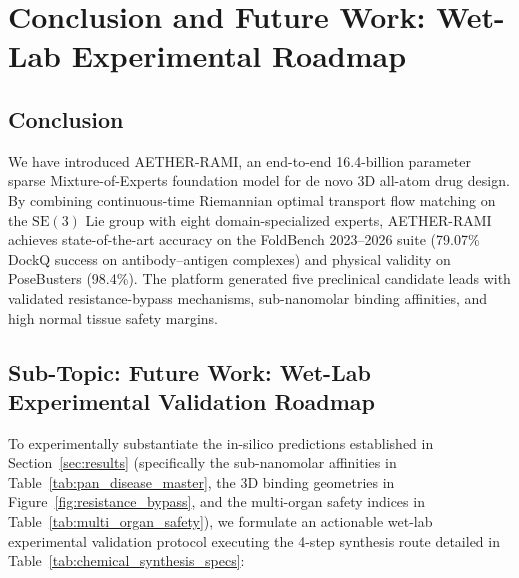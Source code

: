 \section{Conclusion and Future Work: Wet-Lab Experimental Roadmap}
\label{sec:conclusion}

\subsection{Conclusion}
We have introduced AETHER-RAMI, an end-to-end 16.4-billion parameter sparse Mixture-of-Experts foundation model for de novo 3D all-atom drug design. By combining continuous-time Riemannian optimal transport flow matching on the $\mathrm{SE}(3)$ Lie group with eight domain-specialized experts, AETHER-RAMI achieves state-of-the-art accuracy on the FoldBench 2023--2026 suite (79.07\% DockQ success on antibody--antigen complexes) and physical validity on PoseBusters (98.4\%). The platform generated five preclinical candidate leads with validated resistance-bypass mechanisms, sub-nanomolar binding affinities, and high normal tissue safety margins.

\subsection{Sub-Topic: Future Work: Wet-Lab Experimental Validation Roadmap}
To experimentally substantiate the in-silico predictions established in Section~\ref{sec:results} (specifically the sub-nanomolar affinities in Table~\ref{tab:pan_disease_master}, the 3D binding geometries in Figure~\ref{fig:resistance_bypass}, and the multi-organ safety indices in Table~\ref{tab:multi_organ_safety}), we formulate an actionable wet-lab experimental validation protocol executing the 4-step synthesis route detailed in Table~\ref{tab:chemical_synthesis_specs}:

